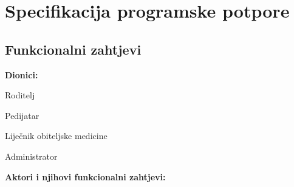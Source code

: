 \chapter{Specifikacija programske potpore}
		
	\section{Funkcionalni zahtjevi}
			
			\noindent \textbf{Dionici:}
			
			\begin{packed_enum}
				
				\item Roditelj
				\item Pedijatar
                \item Liječnik obiteljske medicine
                \item Administrator
                
			\end{packed_enum}
			
			\noindent \textbf{Aktori i njihovi funkcionalni zahtjevi:}
			
